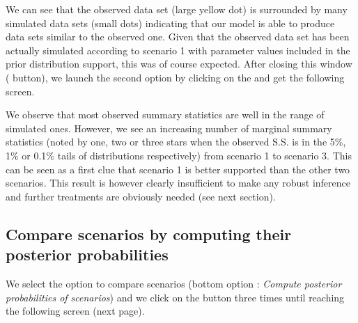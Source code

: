 
We can see that the observed data set (large yellow dot) is surrounded by many simulated data sets (small dots) indicating that our model is able to produce data sets similar to the observed one. Given that the observed data set has been actually simulated according to scenario 1 with parameter values included in the prior distribution support, this was of course expected. After closing this window ( button), we launch the second option by clicking on the  and get the following screen.

\newpage


We observe that most observed summary statistics are well in the range of simulated ones. However, we see an increasing number of marginal summary statistics (noted by one, two or three stars when the observed S.S. is in the 5\%, 1\% or 0.1\% tails of distributions respectively) from scenario 1 to scenario 3. This can be seen as a first clue that scenario 1 is better supported than the other two scenarios. This result is however clearly insufficient to make any robust inference and further treatments are obviously needed (see next section).
\newpage
\subsection{Compare scenarios by computing their posterior probabilities}


We select the option to compare scenarios (bottom option : \emph{Compute posterior probabilities of scenarios}) and we click on the \fbox{\textsf{$>>$}} button three times until reaching the following screen (next page).



